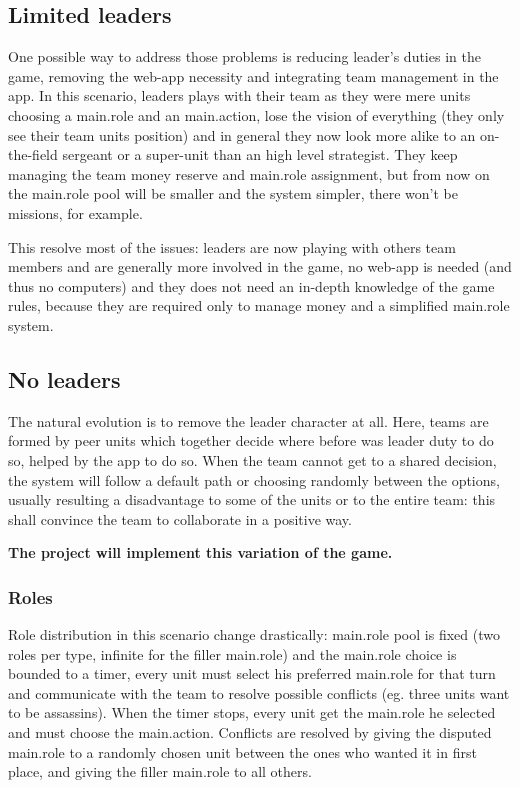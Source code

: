 		\subsection{Limited leaders}
		
			One possible way to address those problems is reducing leader's duties in the game, removing the web-app necessity and integrating team management in the app.
			In this scenario, leaders plays with their team as they were mere units choosing a main.role and an main.action, lose the vision of everything (they only see their team units position) and in general they now look more alike to an on-the-field sergeant or a super-unit than an high level strategist.
			They keep managing the team money reserve and main.role assignment, but from now on the main.role pool will be smaller and the system simpler, there won't be missions, for example.
			
			This resolve most of the issues: leaders are now playing with others team members and are generally more involved in the game, no web-app is needed (and thus no computers) and they does not need an in-depth knowledge of the game rules, because they are required only to manage money and a simplified main.role system.
		
		\subsection{No leaders}
		
			The natural evolution is to remove the leader character at all.
			Here, teams are formed by peer units which together decide where before was leader duty to do so, helped by the app to do so.
			When the team cannot get to a shared decision, the system will follow a default path or choosing randomly between the options, usually resulting a disadvantage to some of the units or to the entire team: this shall convince the team to collaborate in a positive way.
			
			\textbf{The project will implement this variation of the game.}
			
			\subsubsection{Roles}
			\label{nolead:main.role}
				Role distribution in this scenario change drastically: main.role pool is fixed (two roles per type, infinite for the filler main.role) and the main.role choice is bounded to a timer, every unit must select his preferred main.role for that turn and communicate with the team to resolve possible conflicts (eg. three units want to be assassins).
				When the timer stops, every unit get the main.role he selected and must choose the main.action. Conflicts are resolved by giving the disputed main.role to a randomly chosen unit between the ones who wanted it in first place, and giving the filler main.role to all others.
				
